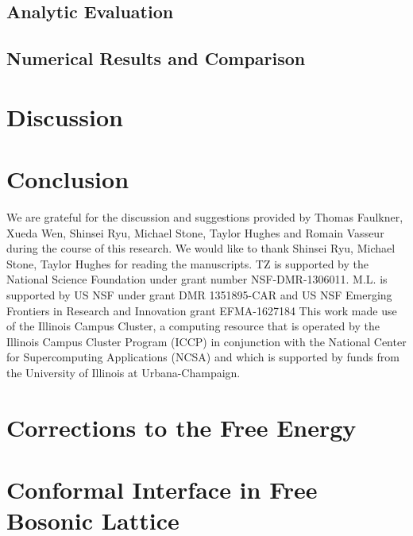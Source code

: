 \documentclass[reprint, prb]{revtex4-1}
\begin{document}
\subsection{Analytic Evaluation}
\label{sec_sub:analy_eval}

\subsection{Numerical Results and Comparison}


\section{Discussion}
\label{sec:disc}



\section{Conclusion}
\label{sec:conclusion}



\begin{acknowledgments}
We are grateful for the discussion and suggestions provided by Thomas Faulkner, Xueda Wen, Shinsei Ryu, Michael Stone, Taylor Hughes and Romain Vasseur during the course of this research. We would like to thank Shinsei Ryu, Michael Stone, Taylor Hughes for reading the manuscripts. 
TZ is supported by the National Science Foundation under grant number NSF-DMR-1306011.
M.L. is supported by US NSF under grant DMR 1351895-CAR and US NSF Emerging Frontiers in Research and Innovation grant EFMA-1627184
This work made use of the Illinois Campus Cluster, a computing resource that is operated by the Illinois Campus Cluster Program (ICCP) in conjunction with the National Center for Supercomputing Applications (NCSA) and which is supported by funds from the University of Illinois at Urbana-Champaign.
\end{acknowledgments}

\appendix
\section{Corrections to the Free Energy}
\label{app:F_correction}


\section{Conformal Interface in Free Bosonic Lattice}
\label{app:interface_free_boson}

\end{document}
